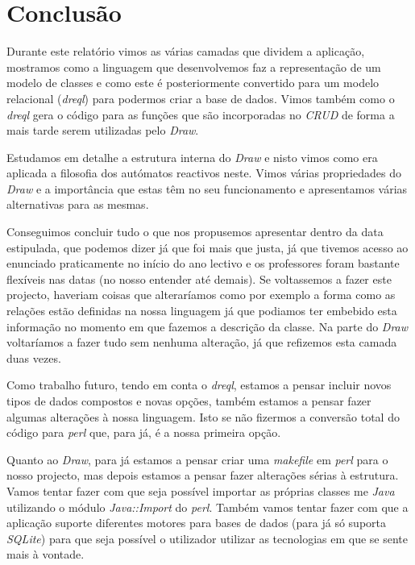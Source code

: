 \documentclass[a4paper]{article}
\begin{document}
\newpage



\newpage
\section{\LARGE Conclusão}

\hspace{1cm}Durante este relatório vimos as várias camadas que dividem a aplicação, mostramos como a linguagem que desenvolvemos faz a representação de um modelo de classes e como este é posteriormente convertido para um modelo relacional ({\em dreql}) para podermos criar a base de dados. Vimos também como o {\em dreql} gera o código para as funções que são incorporadas no {\em CRUD} de forma a mais tarde serem utilizadas pelo {\em Draw}.

\hspace{1cm}Estudamos em detalhe a estrutura interna do {\em Draw} e nisto vimos como era aplicada a filosofia dos autómatos reactivos neste. Vimos várias propriedades do {\em Draw} e a importância que estas têm no seu funcionamento e apresentamos várias alternativas para as mesmas.

\hspace{1cm}Conseguimos concluir tudo o que nos propusemos apresentar dentro da data estipulada, que podemos dizer já que foi mais que justa, já que tivemos acesso ao enunciado praticamente no início do ano lectivo e os professores foram bastante flexíveis nas datas (no nosso entender até demais). Se voltassemos a fazer este projecto, haveriam coisas que alteraríamos como por exemplo a forma como as relações estão definidas na nossa linguagem já que podiamos ter embebido esta informação no momento em que fazemos a descrição da classe. Na parte do {\em Draw} voltaríamos a fazer tudo sem nenhuma alteração, já que refizemos esta camada duas vezes.

\hspace{1cm}Como trabalho futuro, tendo em conta o {\em dreql}, estamos a pensar incluir novos tipos de dados compostos e novas opções, também estamos a pensar fazer algumas alterações à nossa linguagem. Isto se não fizermos a conversão total do código para {\em perl} que, para já, é a nossa primeira opção.

\hspace{1cm}Quanto ao {\em Draw}, para já estamos a pensar criar uma {\em makefile} em {\em perl} para o nosso projecto, mas depois estamos a pensar fazer alterações sérias à estrutura. Vamos tentar fazer com que seja possível importar as próprias classes me {\em Java} utilizando o módulo {\em Java::Import} do {\em perl}. Também vamos tentar fazer com que a aplicação suporte diferentes motores para bases de dados (para já só suporta {\em SQLite}) para que seja possível o utilizador utilizar as tecnologias em que se sente mais à vontade.
\end{document}
